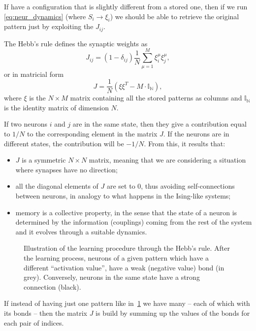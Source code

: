 \documentclass[\rootdir/main.tex]{subfiles}
\begin{document}
If have a configuration that is slightly different from a stored one, then if we run \cref{eq:neur_dynamics} (where $S_i \rightarrow \xi_i$) we should be able to retrieve the original pattern just by exploiting the $J_{ij}$.
\begin{definition}
The Hebb's rule defines the synaptic weights as
\begin{equation}\label{eq:weights}
    J_{ij} = (1 - \delta_{ij})\frac{1}{N} \sum_{\mu = 1}^{M} \xi_i^\mu \xi_j^\mu,
\end{equation}
or in matricial form
\begin{equation}
    J = \frac{1}{N}\left( \xi \xi^T - M \cdot \mathbb{I_N} \right),
\end{equation}
where $\xi$ is the $N \times M$ matrix containing all the stored patterns as columns and $\mathbb{I_N}$ is the identity matrix of dimension $N$.
\end{definition}
If two neurons $i$ and $j$ are in the same state, then they give a contribution equal to $1/N$ to the corresponding element in the matrix $J$. If the neurons are in different states, the contribution will be $-1/N$. From this, it results that:
\begin{itemize}
    \item $J$ is a symmetric $N \times N$ matrix, meaning that we are considering a situation where synapses have no direction;
    \item all the diagonal elements of $J$ are set to $0$, thus avoiding self-connections between neurons, in analogy to what happens in the Ising-like systems;
    \item memory is a collective property, in the sense that the state of a neuron is determined by the information (couplings) coming from the rest of the system and it evolves through a suitable dynamics.
\end{itemize}
\begin{figure}
    \centering
    
    \caption{Illustration of the learning procedure through the Hebb's rule. After the learning process, neurons of a given pattern which have a different ``activation value'', have a weak (negative value) bond (in grey). Conversely, neurons in the same state have a strong connection (black).}
    \label{fig:hebbian_rule}
\end{figure}
If instead of having just one pattern like in~\cref{fig:hebbian_rule} we have many -- each of which with its bonds -- then the matrix $J$ is build by summing up the values of the bonds for each pair of indices.
\end{document}
